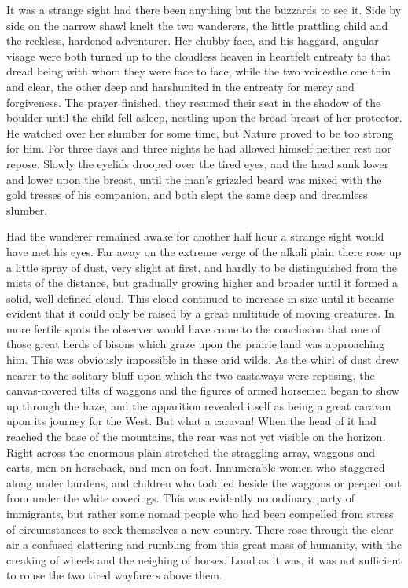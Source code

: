 \documentclass[12pt,english]{book}
\begin{document}
It was a strange sight had there been anything but the buzzards to
see it. Side by side on the narrow shawl knelt the two wanderers,
the little prattling child and the reckless, hardened adventurer.
Her chubby face, and his haggard, angular visage were both turned
up to the cloudless heaven in heartfelt entreaty to that dread being
with whom they were face to face, while the two voices\mdsh{---}the
one thin and clear, the other deep and harsh\mdsh{---}united in the
entreaty for mercy and forgiveness. The prayer finished, they resumed
their seat in the shadow of the boulder until the child fell asleep,
nestling upon the broad breast of her protector. He watched over her
slumber for some time, but Nature proved to be too strong for him.
For three days and three nights he had allowed himself neither rest
nor repose. Slowly the eyelids drooped over the tired eyes, and the
head sunk lower and lower upon the breast, until the man's grizzled
beard was mixed with the gold tresses of his companion, and both slept
the same deep and dreamless slumber.

Had the wanderer remained awake for another half hour a strange sight
would have met his eyes. Far away on the extreme verge of the alkali
plain there rose up a little spray of dust, very slight at first,
and hardly to be distinguished from the mists of the distance, but
gradually growing higher and broader until it formed a solid, well-defined
cloud. This cloud continued to increase in size until it became evident
that it could only be raised by a great multitude of moving creatures.
In more fertile spots the observer would have come to the conclusion
that one of those great herds of bisons which graze upon the prairie
land was approaching him. This was obviously impossible in these arid
wilds. As the whirl of dust drew nearer to the solitary bluff upon
which the two castaways were reposing, the canvas-covered tilts of
waggons and the figures of armed horsemen began to show up through
the haze, and the apparition revealed itself as being a great caravan
upon its journey for the West. But what a caravan! When the head of
it had reached the base of the mountains, the rear was not yet visible
on the horizon. Right across the enormous plain stretched the straggling
array, waggons and carts, men on horseback, and men on foot. Innumerable
women who staggered along under burdens, and children who toddled
beside the waggons or peeped out from under the white coverings. This
was evidently no ordinary party of immigrants, but rather some nomad
people who had been compelled from stress of circumstances to seek
themselves a new country. There rose through the clear air a confused
clattering and rumbling from this great mass of humanity, with the
creaking of wheels and the neighing of horses. Loud as it was, it
was not sufficient to rouse the two tired wayfarers above them.
\end{document}

